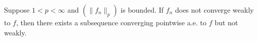 Suppose $1 < p < \infty$ and $(\|f_n\|_p)$ is bounded. If $f_n$ does not converge weakly to $f$, then there exists a subsequence converging pointwise a.e. to $f$ but not weakly.
